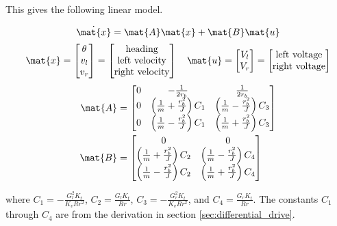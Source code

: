 This gives the following linear model.
\begin{theorem}
  \begin{equation*}
    \dot{\mat{x}} = \mat{A}\mat{x} + \mat{B}\mat{u}
  \end{equation*}
  \begin{equation*}
    \mat{x} =
    \begin{bmatrix}
      \theta \\
      v_l \\
      v_r
    \end{bmatrix} =
    \begin{bmatrix}
      \text{heading} \\
      \text{left velocity} \\
      \text{right velocity}
    \end{bmatrix}
    \quad
    \mat{u} =
    \begin{bmatrix}
      V_l \\
      V_r
    \end{bmatrix} =
    \begin{bmatrix}
      \text{left voltage} \\
      \text{right voltage}
    \end{bmatrix}
  \end{equation*}
  \begin{align}
    \mat{A} &=
    \begin{bmatrix}
      0 & -\frac{1}{2r_b} & \frac{1}{2r_b} \\
      0 & \left(\frac{1}{m} + \frac{r_b^2}{J}\right) C_1 &
        \left(\frac{1}{m} - \frac{r_b^2}{J}\right) C_3 \\
      0 & \left(\frac{1}{m} - \frac{r_b^2}{J}\right) C_1 &
        \left(\frac{1}{m} + \frac{r_b^2}{J}\right) C_3
    \end{bmatrix} \\
    \mat{B} &=
    \begin{bmatrix}
      0 & 0 \\
      \left(\frac{1}{m} + \frac{r_b^2}{J}\right) C_2 &
      \left(\frac{1}{m} - \frac{r_b^2}{J}\right) C_4 \\
      \left(\frac{1}{m} - \frac{r_b^2}{J}\right) C_2 &
      \left(\frac{1}{m} + \frac{r_b^2}{J}\right) C_4
    \end{bmatrix}
  \end{align}

  where $C_1 = -\frac{G_l^2 K_t}{K_v R r^2}$, $C_2 = \frac{G_l K_t}{Rr}$,
  $C_3 = -\frac{G_r^2 K_t}{K_v R r^2}$, and $C_4 = \frac{G_r K_t}{Rr}$. The
  constants $C_1$ through $C_4$ are from the derivation in section
  \ref{sec:differential_drive}.
\end{theorem}

